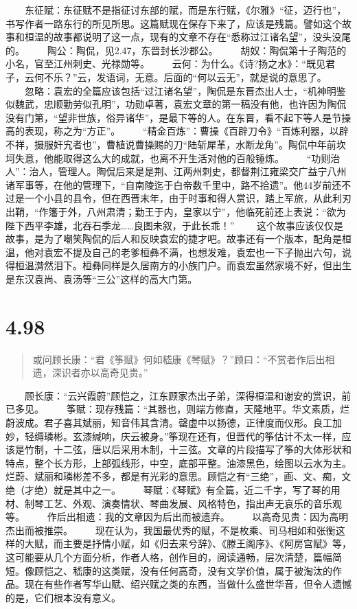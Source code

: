 \documentclass[]{book}
\begin{document}
　　东征赋：东征赋不是指征讨东部的赋，而是东行赋，《尔雅》``征，迈行也''，书写作者一路东行的所见所思。这篇赋现在保存下来了，应该是残篇。譬如这个故事和桓温的故事都说明了这一点，现有的文章不存在``悉称过江诸名望''，没头没尾的。
　　陶公：陶侃，见2.47，东晋封长沙郡公。
　　胡奴：陶侃第十子陶范的小名，官至江州刺史、光禄勋等。
　　云何：为什么。《诗?扬之水》：``既见君子，云何不乐？''云，发语词，无意。后面的``何以云无''，就是说的意思了。
　　忽略：袁宏的全篇应该包括``过江诸名望''，陶侃是东晋杰出人士，``机神明鉴似魏武，忠顺勤劳似孔明''，功勋卓著，袁宏文章的第一稿没有他，也许因为陶侃没有门第，``望非世族，俗异诸华''，是最下等的人。在东晋，看不起下等人是节操高的表现，称之为``方正''。
　　``精金百炼''：曹操《百辟刀令》``百炼利器，以辟不祥，摄服奸宄者也''，曹植说曹操赐的刀``陆斩犀革，水断龙角''。陶侃中年前坎坷失意，他能取得这么大的成就，也离不开生活对他的百般锤炼。
　　``功则治人''：治人，管理人。陶侃后来是是荆、江两州刺史，都督荆江雍梁交广益宁八州诸军事等，在他的管理下，``自南陵迄于白帝数千里中，路不拾遗''。他44岁前还不过是一个小县的县令，但在西晋末年，由于时事和得人赏识，踏上军旅，从此利刃出鞘，``作籓于外，八州肃清；勤王于内，皇家以宁''，他临死前还上表说：``欲为陛下西平李雄，北吞石季龙\ldots{}\ldots{}良图未叙，于此长乖！''
　　这个故事应该仅仅是故事，是为了嘲笑陶侃的后人和反映袁宏的捷才吧。故事还有一个版本，配角是桓温，他对袁宏不提及自己的老爹桓彝不满，也想发难，袁宏也一下子抛出六句，说得桓温潸然泪下。桓彝同样是久居南方的小族门户。而袁宏虽然家境不好，但出生是东汉袁尚、袁汤等``三公''这样的高大门第。

\section{4.98}\label{section-273}

\begin{quote}
或问顾长康：``君《筝赋》何如嵇康《琴赋》？''顾曰：``不赏者作后出相遗，深识者亦以高奇见贵。''
\end{quote}

　　顾长康：``云兴霞蔚''顾恺之，江东顾家杰出子弟，深得桓温和谢安的赏识，前已多见。
　　筝赋：现存残篇：``其器也，则端方修直，天隆地平。华文素质，烂蔚波成。君子喜其斌丽，知音伟其含清。罄虚中以扬德，正律度而仪形。良工加妙，轻缛璘彬。玄漆缄响，庆云被身。''筝现在还有，但晋代的筝估计不太一样，应该是竹制，十二弦，唐以后采用木制，十三弦。文章的片段描写了筝的大体形状和特点，整个长方形，上部弧线形，中空，底部平整。油漆黑色，绘图以云水为主。烂蔚、斌丽和璘彬差不多，都是有光彩的意思。顾恺之有``三绝''，画、文、痴，文绝（才绝）就是其中之一。
　　琴赋：《琴赋》有全篇，近二千字，写了琴的用材、制琴工艺、外观、演奏情状、琴曲发展、风格特色，指出声无哀乐的音乐观等。
　　作后出相遗：我的文章因为后出而被遗弃。
　　以高奇见贵：因为高明杰出而被推崇。
　　现在认为，我国最优秀的赋，不是枚乘、司马相如和张衡这样的大赋，而主要是抒情小赋，如《归去来兮辞》、《滕王阁序》、《阿房宫赋》等，这可能要从几个方面分析，作者人格，创作目的，阅读通畅，层次清楚，篇幅简短。像顾恺之、嵇康的这类赋，没有任何高奇，没有文学价值，属于被淘汰的作品。现在有些作者写华山赋、绍兴赋之类的东西，当做什么盛世华音，但令人遗憾的是，它们根本没有意义。
\end{document}
